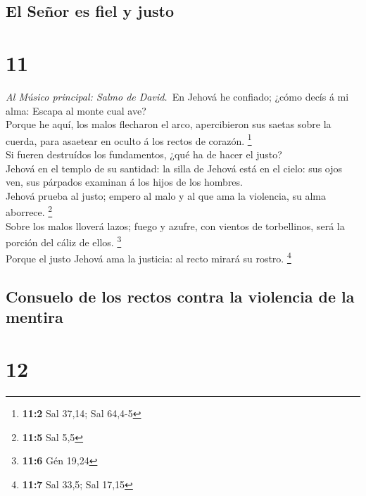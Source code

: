 \hypertarget{el-seuxf1or-es-fiel-y-justo}{%
\subsection{El Señor es fiel y
justo}\label{el-seuxf1or-es-fiel-y-justo}}

\hypertarget{section-10}{%
\section{11}\label{section-10}}

 \emph{Al Músico principal: Salmo de David.}~En Jehová he
confiado; ¿cómo decís á mi alma: Escapa al monte cual ave?\\
 Porque he aquí, los malos flecharon el arco, apercibieron
sus saetas sobre la cuerda, para asaetear en oculto á los rectos de
corazón. \footnote{\textbf{11:2} Sal 37,14; Sal 64,4-5}\\
 Si fueren destruídos los fundamentos, ¿qué ha de hacer el
justo?\\
 Jehová en el templo de su santidad: la silla de Jehová está
en el cielo: sus ojos ven, sus párpados examinan á los hijos de los
hombres.\\
 Jehová prueba al justo; empero al malo y al que ama la
violencia, su alma aborrece. \footnote{\textbf{11:5} Sal 5,5}\\
 Sobre los malos lloverá lazos; fuego y azufre, con vientos
de torbellinos, será la porción del cáliz de ellos. \footnote{\textbf{11:6}
  Gén 19,24}\\
 Porque el justo Jehová ama la justicia: al recto mirará su
rostro. \footnote{\textbf{11:7} Sal 33,5; Sal 17,15}

\hypertarget{consuelo-de-los-rectos-contra-la-violencia-de-la-mentira}{%
\subsection{Consuelo de los rectos contra la violencia de la
mentira}\label{consuelo-de-los-rectos-contra-la-violencia-de-la-mentira}}

\hypertarget{section-11}{%
\section{12}\label{section-11}}

